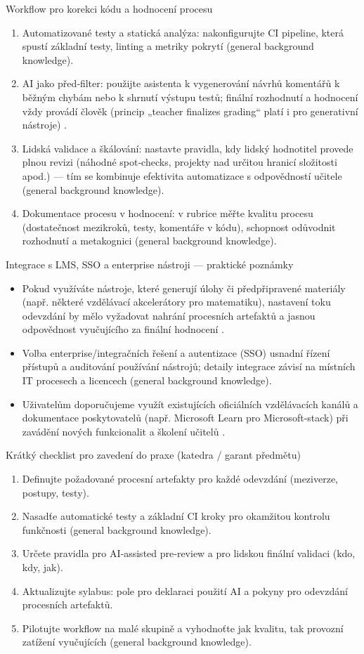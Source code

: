 Workflow pro korekci kódu a hodnocení procesu
\begin{enumerate}
  \item Automatizované testy a statická analýza: nakonfigurujte CI pipeline, která spustí základní testy, linting a metriky pokrytí (general background knowledge).
  \item AI jako před‑filter: použijte asistenta k vygenerování návrhů komentářů k běžným chybám nebo k shrnutí výstupu testů; finální rozhodnutí a hodnocení vždy provádí člověk (princip „teacher finalizes grading“ platí i pro generativní nástroje) \cite{kb_ai_101_tipu_pdf_04e4a115_page_8_1}.
  \item Lidská validace a škálování: nastavte pravidla, kdy lidský hodnotitel provede plnou revizi (náhodné spot‑checks, projekty nad určitou hranicí složitosti apod.) — tím se kombinuje efektivita automatizace s odpovědností učitele (general background knowledge).
  \item Dokumentace procesu v hodnocení: v rubrice měřte kvalitu procesu (dostatečnost mezikroků, testy, komentáře v kódu), schopnost odůvodnit rozhodnutí a metakognici (general background knowledge).
\end{enumerate}

Integrace s LMS, SSO a enterprise nástroji — praktické poznámky
\begin{itemize}
  \item Pokud využíváte nástroje, které generují úlohy či předpřipravené materiály (např. některé vzdělávací akcelerátory pro matematiku), nastavení toku odevzdání by mělo vyžadovat nahrání procesních artefaktů a jasnou odpovědnost vyučujícího za finální hodnocení \cite{kb_ai_101_tipu_pdf_04e4a115_page_8_1}.
  \item Volba enterprise/integračních řešení a autentizace (SSO) usnadní řízení přístupů a auditování používání nástrojů; detaily integrace závisí na místních IT procesech a licencech (general background knowledge).
  \item Uživatelům doporučujeme využít existujících oficiálních vzdělávacích kanálů a dokumentace poskytovatelů (např. Microsoft Learn pro Microsoft‑stack) při zavádění nových funkcionalit a školení učitelů \cite{kb_ai_101_tipu_pdf_04e4a115_page_54_1}.
\end{itemize}

Krátký checklist pro zavedení do praxe (katedra / garant předmětu)
\begin{enumerate}
  \item Definujte požadované procesní artefakty pro každé odevzdání (meziverze, postupy, testy).
  \item Nasadťe automatické testy a základní CI kroky pro okamžitou kontrolu funkčnosti (general background knowledge).
  \item Určete pravidla pro AI‑assisted pre‑review a pro lidskou finální validaci (kdo, kdy, jak).
  \item Aktualizujte sylabus: pole pro deklaraci použití AI a pokyny pro odevzdání procesních artefaktů.
  \item Pilotujte workflow na malé skupině a vyhodnoťte jak kvalitu, tak provozní zatížení vyučujících (general background knowledge).
\end{enumerate}

